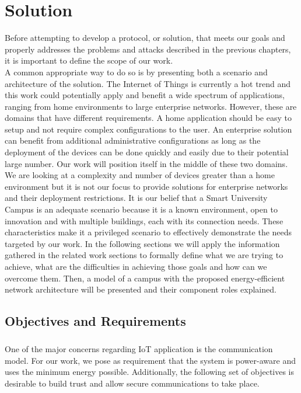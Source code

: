
\chapter{Solution}
\label{chapter:proposed_solution}

Before attempting to develop a protocol, or solution, that meets our goals and properly addresses the problems and attacks described in the previous chapters, it is important to define the scope of our work.\\ A common appropriate way to do so is by presenting both a scenario and architecture of the solution. The Internet of Things is currently a hot trend and this work could potentially apply and benefit a wide spectrum of applications, ranging from home environments to large enterprise networks. However, these are domains that have different requirements. A home application should be easy to setup and not require complex configurations to the user. An enterprise solution can benefit from additional administrative configurations as long as the deployment of the devices can be done quickly and easily due to their potential large number. Our work will position itself in the middle of these two domains. We are looking at a complexity and number of devices greater than a home environment but it is not our focus to provide solutions for enterprise networks and their deployment restrictions. It is our belief that a Smart University Campus is an adequate scenario because it is a known environment, open to innovation and with multiple buildings, each with its connection needs. These characteristics make it a privileged scenario to effectively demonstrate the needs targeted by our work. In the following sections we will apply the information gathered in the related work sections to formally define what we are trying to achieve, what are the difficulties in achieving those goals and how can we overcome them. Then, a model of a campus with the proposed energy-efficient network architecture will be presented and their component roles explained. 

\section{Objectives and Requirements}
\paragraph{}
One of the major concerns regarding \gls{IoT} application is the communication model. For our work, we pose as requirement that the system is power-aware and uses the minimum energy possible. Additionally, the following set of objectives is desirable to build trust and allow secure communications to take place.

